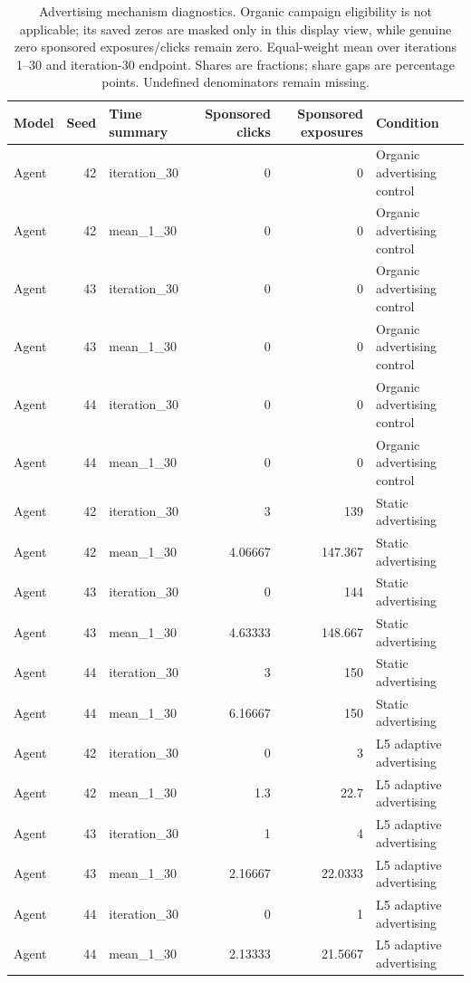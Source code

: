 \begin{table}[htbp!]
\centering
\small
\setlength{\tabcolsep}{3pt}
\renewcommand{\arraystretch}{1.1}
\begin{tabular}{lrlrrl}
\hline
Model & Seed & Time summary & Sponsored clicks & Sponsored exposures & Condition \\
\hline
Agent & 42 & iteration\_30 & 0 & 0 & Organic advertising control \\
Agent & 42 & mean\_1\_30 & 0 & 0 & Organic advertising control \\
Agent & 43 & iteration\_30 & 0 & 0 & Organic advertising control \\
Agent & 43 & mean\_1\_30 & 0 & 0 & Organic advertising control \\
Agent & 44 & iteration\_30 & 0 & 0 & Organic advertising control \\
Agent & 44 & mean\_1\_30 & 0 & 0 & Organic advertising control \\
Agent & 42 & iteration\_30 & 3 & 139 & Static advertising \\
Agent & 42 & mean\_1\_30 & 4.06667 & 147.367 & Static advertising \\
Agent & 43 & iteration\_30 & 0 & 144 & Static advertising \\
Agent & 43 & mean\_1\_30 & 4.63333 & 148.667 & Static advertising \\
Agent & 44 & iteration\_30 & 3 & 150 & Static advertising \\
Agent & 44 & mean\_1\_30 & 6.16667 & 150 & Static advertising \\
Agent & 42 & iteration\_30 & 0 & 3 & L5 adaptive advertising \\
Agent & 42 & mean\_1\_30 & 1.3 & 22.7 & L5 adaptive advertising \\
Agent & 43 & iteration\_30 & 1 & 4 & L5 adaptive advertising \\
Agent & 43 & mean\_1\_30 & 2.16667 & 22.0333 & L5 adaptive advertising \\
Agent & 44 & iteration\_30 & 0 & 1 & L5 adaptive advertising \\
Agent & 44 & mean\_1\_30 & 2.13333 & 21.5667 & L5 adaptive advertising \\
\hline
\end{tabular}
\caption{Advertising mechanism diagnostics. Organic campaign eligibility is not applicable; its saved zeros are masked only in this display view, while genuine zero sponsored exposures/clicks remain zero. Equal-weight mean over iterations 1--30 and iteration-30 endpoint. Shares are fractions; share gaps are percentage points. Undefined denominators remain missing.}
\label{chap:results:tab:rq1_advertising_sponsored_counts}
\end{table}
